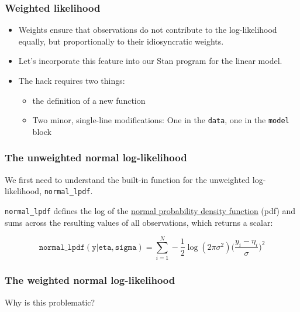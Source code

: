 \documentclass[
  11pt,
]{article}
\providecommand{\tightlist}{%
  \setlength{\itemsep}{0pt}\setlength{\parskip}{0pt}}
\begin{document}
\hypertarget{weighted-likelihood}{%
\subsubsection{Weighted likelihood}\label{weighted-likelihood}}

\begin{itemize}
\tightlist
\item
  Weights ensure that observations do not contribute to the log-likelihood equally, but proportionally to their idiosyncratic weights.
\item
  Let's incorporate this feature into our Stan program for the linear model.
\item
  The hack requires two things:

  \begin{itemize}
  \tightlist
  \item
    the definition of a new function
  \item
    Two minor, single-line modifications: One in the \texttt{data}, one in the \texttt{model} block
  \end{itemize}
\end{itemize}

\hypertarget{the-unweighted-normal-log-likelihood}{%
\subsubsection{The unweighted normal log-likelihood}\label{the-unweighted-normal-log-likelihood}}

We first need to understand the built-in function for the unweighted log-likelihood, \texttt{normal\_lpdf}.

\texttt{normal\_lpdf} defines the log of the \href{https://en.wikipedia.org/wiki/Normal_distribution}{normal probability density function} (pdf) and sums across the resulting values of all observations, which returns a scalar:

\[ \mathtt{normal\_lpdf(y | eta, sigma)} = \sum_{i=1}^{N} - \frac{1}{2} \log (2 \pi \sigma^2) \Big( \frac{y_i-\eta_i}{\sigma}\Big)^2\]

\hypertarget{the-weighted-normal-log-likelihood}{%
\subsubsection{The weighted normal log-likelihood}\label{the-weighted-normal-log-likelihood}}

Why is this problematic?
\end{document}
